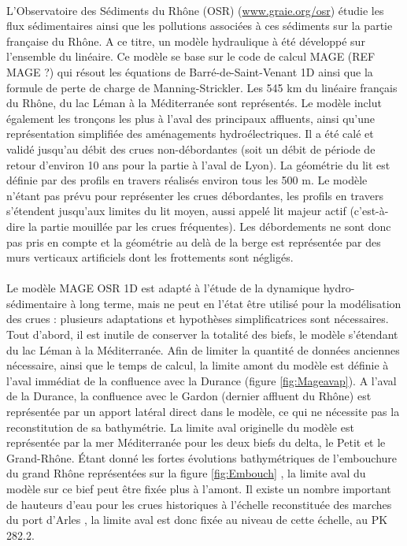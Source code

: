 \documentclass[11pt]{article}
\begin{document}
	 \paragraph{} L'Observatoire des Sédiments du Rhône (OSR) (\url{www.graie.org/osr}) étudie les flux sédimentaires ainsi que les pollutions associées à ces sédiments sur la partie française du Rhône. A ce titre, un modèle hydraulique à été développé sur l'ensemble du linéaire. Ce modèle se base sur le code de calcul MAGE (REF MAGE ?) qui résout les équations de Barré-de-Saint-Venant 1D ainsi que la formule de perte de charge de Manning-Strickler. Les 545 km du linéaire français du Rhône, du lac Léman à la Méditerranée sont représentés. Le modèle inclut également les tronçons les plus à l'aval des principaux affluents, ainsi qu'une représentation simplifiée des aménagements hydroélectriques. Il a été calé et validé jusqu'au débit des crues non-débordantes (soit un débit de période de retour d'environ 10 ans pour la partie à l'aval de Lyon). La géométrie du lit est définie par des profils en travers réalisés environ tous les 500 m. Le modèle n'étant pas prévu pour représenter les crues débordantes, les profils en travers s'étendent jusqu'aux limites du lit moyen, aussi appelé lit majeur actif (c'est-à-dire la partie mouillée par les crues fréquentes). Les débordements ne sont donc pas pris en compte et la géométrie au delà de la berge est représentée par des murs verticaux artificiels dont les frottements sont négligés. 
	 
	 \paragraph{} Le modèle MAGE OSR 1D est adapté à l'étude de la dynamique hydro-sédimentaire à long terme, mais ne peut en l'état être utilisé pour la modélisation des crues : plusieurs adaptations et hypothèses simplificatrices sont nécessaires. Tout d'abord, il est inutile de conserver la totalité des biefs, le modèle s'étendant du lac Léman à la Méditerranée. Afin de limiter la quantité de données anciennes nécessaire, ainsi que le temps de calcul, la limite amont du modèle est définie à l'aval immédiat de la confluence avec la Durance (figure \ref{fig:Mageavap}). A l'aval de la Durance, la confluence avec le Gardon (dernier affluent du Rhône) est représentée par un apport latéral direct dans le modèle, ce qui ne nécessite pas la reconstitution de sa bathymétrie. La limite aval originelle du modèle est représentée par la mer Méditerranée pour les deux biefs du delta, le Petit et le Grand-Rhône. Étant donné les fortes évolutions bathymétriques de l'embouchure du grand Rhône représentées sur la figure \ref{fig:Embouch} \citep{pichard_les_2014}, la limite aval du modèle sur ce bief peut être fixée plus à l'amont. Il existe un nombre important de hauteurs d'eau pour les crues historiques à l'échelle reconstituée des marches du port d'Arles \citep{pichard_les_1995}, la limite aval est donc fixée au niveau de cette échelle, au PK 282.2. 
	
\end{document}
